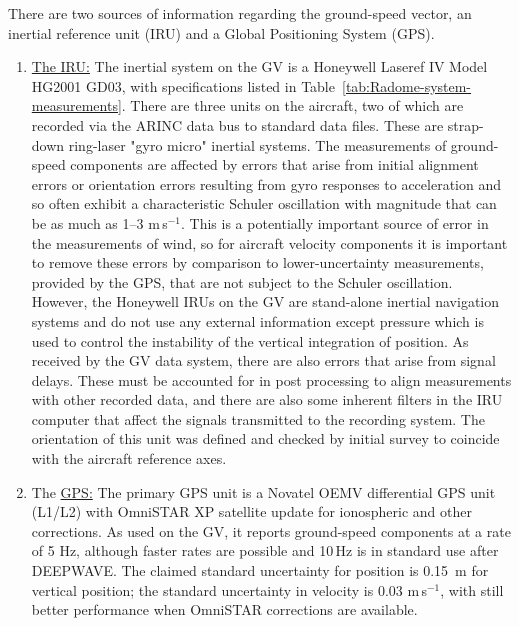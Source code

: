 \documentclass[12pt,twoside,english]{article}\usepackage[]{graphicx}\usepackage[]{color}
\let\OrgIndex\index
\renewcommand*{\index}[1]{\OrgIndex{#1}}
\begin{document}
{There are two sources of information regarding the ground-speed vector, an inertial reference unit (IRU) and a Global Positioning System (GPS).  
\begin{enumerate}
\item \uline{The IRU:} The inertial system on the GV is a Honeywell Laseref IV Model HG2001 GD03, with specifications listed in Table~\ref{tab:Radome-system-measurements}.  There are three units on the aircraft, two of which are recorded via the ARINC data bus to standard data files. These are strap-down ring-laser "gyro micro" inertial systems. The measurements of ground-speed components are affected by errors that arise from initial alignment errors or orientation errors resulting from gyro responses to acceleration and so often exhibit a characteristic Schuler oscillation with magnitude that can be as much as 1--3 m\,s$^{-1}$. This is a potentially important source of error in the measurements of wind, so for aircraft velocity components it is important to remove these errors by comparison to lower-uncertainty measurements, provided by the GPS, that are not subject to the Schuler oscillation. However, the Honeywell IRUs on the GV are stand-alone inertial navigation systems and do not use any external information except pressure which is used to control the instability of the vertical integration of position. As received by the GV data system, there are also errors that arise from signal delays. These must be accounted for in post processing to align measurements with other recorded data, and there are also some inherent filters in the IRU computer that affect the signals transmitted to the recording system. The orientation of this unit was defined and checked by initial survey to coincide with the aircraft reference axes.  
\item The \uline{GPS:} The primary GPS
unit is a Novatel OEMV differential GPS unit (L1/L2) with OmniSTAR XP satellite update for ionospheric and other corrections. As used on the GV, it reports ground-speed components at a rate of 5 Hz, although faster rates are possible and 10\,Hz is in standard use after DEEPWAVE. The claimed standard uncertainty for position is 0.15~m for vertical position; the standard uncertainty in velocity is 0.03 m\,s$^{-1}$, with still better
performance  when OmniSTAR corrections are available.
\end{enumerate}

}
\end{document}
